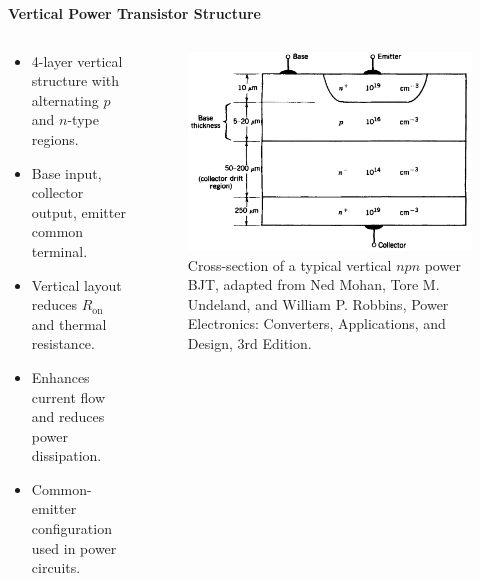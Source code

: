 \begin{frame}{\textbf{Vertical Power Transistor Structure}}
    \begin{columns}
        \begin{column}{0.35\textwidth}
            \begin{itemize}
                \item 4-layer vertical structure with alternating $p$ and $n$-type regions.
                \item Base input, collector output, emitter common terminal.
                \item Vertical layout reduces $R_{\text{on}}$ and thermal resistance.
                \item Enhances current flow and reduces power dissipation.
                \item Common-emitter configuration used in power circuits.
            \end{itemize}
        \end{column}
    
        \begin{column}{0.65\textwidth}
            \begin{figure}
                \centering
                \includegraphics[scale=0.25]{fig/lec04/vertical_BJT_structure.png}
                \caption{Cross-section of a typical vertical $npn$ power BJT, adapted from Ned Mohan, Tore M. Undeland, and William P. Robbins, Power Electronics: Converters, Applications, and Design, 3rd Edition.}
            \end{figure}
        \end{column}
    \end{columns}
\end{frame}

